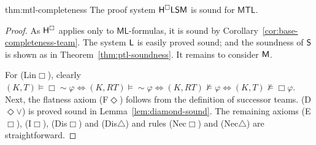 \documentclass[a4paper,english,fleqn,11pt,final]{scrartcl}
\newcommand{\negg}{{\sim}}
\newcommand{\logic}[1]{\ensuremath{\mathsf{#1}}\xspace}
\newcommand{\ML}{\logic{ML}}
\newcommand{\MTL}{\logic{MTL}}
\newcommand{\sfS}{\protect\ensuremath{\mathsf{S}}}
\newcommand{\sfH}{\protect\ensuremath{\mathsf{H}}}
\newcommand{\sfL}{\protect\ensuremath{\mathsf{L}}}
\newcommand{\sfM}{\protect\ensuremath{\mathsf{M}}}
\newcommand{\Deriv}[1]{{\normalfont\textsf{#1}}}
\theoremstyle{plain}
\theoremstyle{definition}
\begin{document}
\begin{reptheorem}{thm:mtl-completeness}
The proof system $\sfH^\Box\sfL\sfS\sfM$ is sound for $\MTL$.
\end{reptheorem}
\begin{proof}
As $\sfH^\Box$ applies only to $\ML$-formulas, it is sound by Corollary~\ref{cor:base-completeness-team}.
The system $\sfL$ is easily proved sound; and the soundness of $\sfS$ is shown as in Theorem~\ref{thm:ptl-soundness}.
It remains to consider $\sfM$.

For \Deriv{(Lin$\Box$)}, clearly $(K,T)\vDash \Box\negg\varphi \Leftrightarrow (K,RT) \vDash \negg \varphi \Leftrightarrow (K,RT) \nvDash \varphi \Leftrightarrow (K,T) \nvDash \Box \varphi$.
Next, the flatness axiom \Deriv{(F$\Diamond$)} follows from the definition of successor teams.
\Deriv{(D$\Diamond\lor$)} is proved sound in Lemma~\ref{lem:diamond-sound}.
The remaining axioms \Deriv{(E$\Box$)}, \Deriv{(I$\Box$)}, \Deriv{(Dis$\Box$)} and \Deriv{(Dis$\triangle$)} and rules  \Deriv{(Nec$\Box$)} and \Deriv{(Nec$\triangle$)} are straightforward.
\end{proof}
\end{document}

